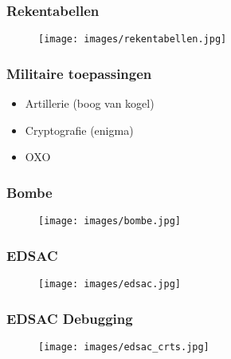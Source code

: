 \documentclass[aspectratio=43]{uva-inf-presentation}
\begin{document}

\begin{frame}
\frametitle{Rekentabellen}

\begin{figure}
\texttt{[image: images/rekentabellen.jpg]}
\end{figure}

\end{frame}


\begin{frame}
\frametitle{Militaire toepassingen}

\begin{itemize}
\item Artillerie (boog van kogel)
\item Cryptografie (enigma)
\item OXO
\end{itemize}

\end{frame}


\begin{frame}
\frametitle{Bombe}

\begin{figure}
\texttt{[image: images/bombe.jpg]}
\end{figure}

\end{frame}


\begin{frame}
\frametitle{EDSAC}

\begin{figure}
\texttt{[image: images/edsac.jpg]}
\end{figure}

\end{frame}


\begin{frame}
\frametitle{EDSAC Debugging}

\begin{figure}
\texttt{[image: images/edsac\_crts.jpg]}
\end{figure}

\end{frame}
\end{document}
